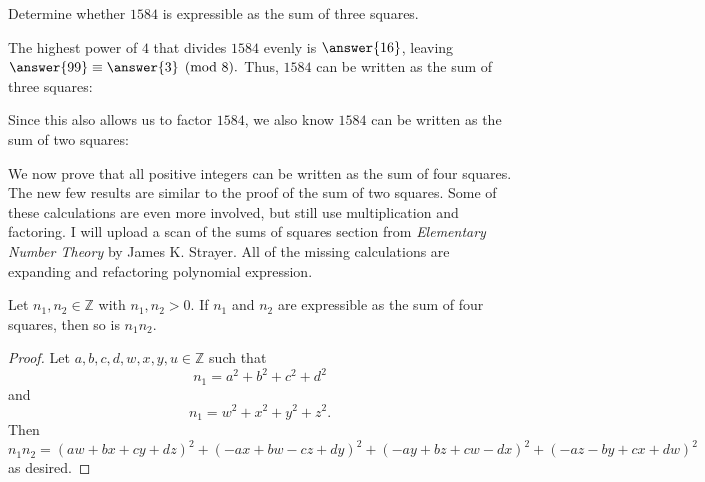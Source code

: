 \documentclass{ximera}
\begin{document}
\begin{example}
 Determine whether $1584$ is expressible as the sum of three squares. 
 
 The highest power of $4$ that divides $1584$ evenly is $\answer{16}$, leaving $\answer{99}\equiv\answer{3} \pmod 8.$ Thus, $1584$ can be written as the sum of three squares:
\begin{multipleChoice}
\end{multipleChoice}

Since this also allows us to factor $1584$, we  also know $1584$ can be written as the sum of two squares:
\begin{multipleChoice}
\end{multipleChoice}
\end{example}

We now prove that all positive integers can be written as the sum of four squares. The new few results are similar to the proof of the sum of two squares. Some of these calculations are even more involved, but still use multiplication and factoring. I will upload a scan of the sums of squares section from \emph{Elementary Number Theory} by James K. Strayer. All of the missing calculations are expanding and refactoring polynomial expression. 

\begin{theorem}[Euler]
 Let $n_1,n_2\in\mathbb{Z}$ with $n_1,n_2>0$. If $n_1$ and $n_2$ are expressible as the sum of four squares, then so is $n_1n_2$. 
\end{theorem}
\begin{proof}
 Let $a,b,c,d,w,x,y,u\in\mathbb{Z}$ such that \[n_1=a^2+b^2+c^2+d^2\] and \[n_1=w^2+x^2+y^2+z^2.\]  Then \[n_1n_2=(aw+bx+cy+dz)^2+(-ax+bw-cz+dy)^2+(-ay+bz+cw-dx)^2+(-az-by+cx+dw)^2 \] as desired.
\end{proof}
\end{document}
